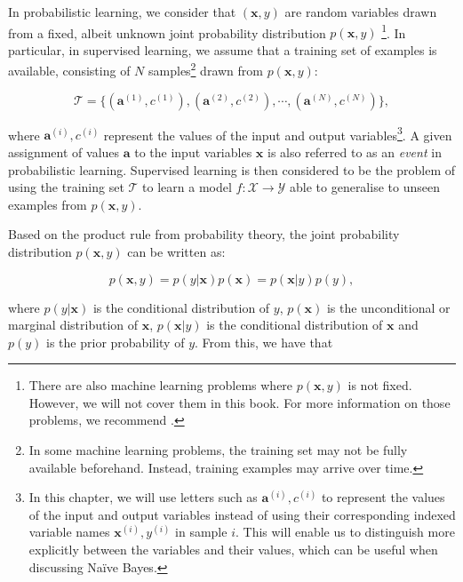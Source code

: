In probabilistic learning, we consider that $(\mathbf{x},y)$ are random variables drawn from a fixed, albeit unknown joint probability distribution $p(\mathbf{x},y)$ \footnote{There are also machine learning problems where  $p(\mathbf{x},y)$ is not fixed. However, we will not cover them in this book. For more information on those problems, we recommend \cite{MLForDataStreams}.}. In particular, in supervised learning, we assume that a training set of examples is available, consisting of $N$ samples\footnote{In some machine learning problems, the training set may not be fully available beforehand. Instead, training examples may arrive over time.} drawn from $p(\mathbf{x},y)$:

\begin{equation} \mathcal{T} = \{(\mathbf{a}^{(1)},c^{(1)}),(\mathbf{a}^{(2)},c^{(2)}),\cdots, (\mathbf{a}^{(N)},c^{(N)})\}, \label{eq:training-set} \end{equation}

\noindent where $\mathbf{a}^{(i)},c^{(i)}$ represent the values of the input and output variables\footnote{In this chapter, we will use letters such as $\mathbf{a}^{(i)},c^{(i)}$ to represent the values of the input and output variables instead of using their corresponding indexed variable names $\mathbf{x}^{(i)},y^{(i)}$ in sample $i$. This will enable us to distinguish more explicitly between the variables and their values, which can be useful when discussing Na\"ive Bayes.}. A given assignment of values $\mathbf{a}$ to the input variables $\mathbf{x}$ is also referred to as an \textit{event} \cite{RussellNorvig} in probabilistic learning.
Supervised learning is then considered to be the problem of using the training set $\mathcal{T}$ to learn a model $f: \mathcal{X} \rightarrow \mathcal{Y}$ able to generalise to unseen examples from $p(\mathbf{x},y)$. %

Based on the product rule from probability theory, the joint probability distribution $p(\mathbf{x},y)$ can be written as:

\[ p(\mathbf{x},y) = p(y|\mathbf{x}) p(\mathbf{x}) = p(\mathbf{x}|y) p(y),\]

\noindent where $p(y|\mathbf{x})$ is the conditional distribution of $y$, $p(\mathbf{x})$ is the unconditional or marginal distribution of $\mathbf{x}$, $p(\mathbf{x}|y)$ is the conditional distribution of $\mathbf{x}$ and $p(y)$ is the prior probability of $y$. From this, we have that

